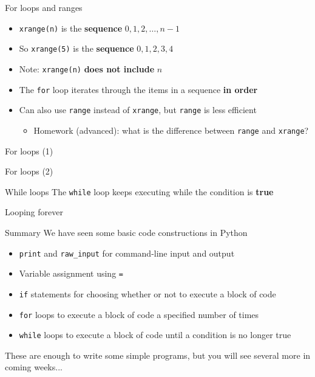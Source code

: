 \begin{frame}{For loops and ranges}

\begin{itemize}
\pause\item \lstinline{xrange(n)} is the \textbf{sequence}
$0, 1, 2, \dots, n-1$
\pause\item So \lstinline{xrange(5)} is the \textbf{sequence}
$0, 1, 2, 3, 4$
\pause\item Note: \lstinline{xrange(n)} \textbf{does not include} $n$
\pause\item The \lstinline{for} loop iterates through the items in a sequence \textbf{in order}
\pause\item Can also use \lstinline{range} instead of \lstinline{xrange},
but \lstinline{range} is less efficient
\begin{itemize}
\item Homework (advanced): what is the difference between \lstinline{range} and \lstinline{xrange}?
\end{itemize}
\end{itemize}
\end{frame}

\begin{frame}{For loops (1)}
\end{frame}

\begin{frame}{For loops (2)}
\end{frame}

\begin{frame}{While loops}
The \lstinline{while} loop keeps executing while the condition is \textbf{true}

\end{frame}

\begin{frame}{Looping forever}

\end{frame}

\begin{frame}{Summary}
\pause We have seen some basic code constructions in Python
\begin{itemize}
\pause\item \lstinline{print} and \lstinline{raw_input} for command-line input and output
\pause\item Variable assignment using \lstinline{=}
\pause\item \lstinline{if} statements for choosing whether or not to execute a block of code
\pause\item \lstinline{for} loops to execute a block of code a specified number of times
\pause\item \lstinline{while} loops to execute a block of code until a condition is no longer true
\end{itemize}
\pause These are enough to write some simple programs, but you will see several more in coming weeks...
\end{frame}

